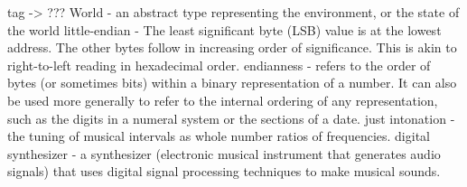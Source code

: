 tag -> ???
World - an abstract type representing the environment, or the state of the world
little-endian - The least significant byte (LSB) value is at the lowest address. The other bytes follow in increasing order of significance. This is akin to right-to-left reading in hexadecimal order.
endianness - refers to the order of bytes (or sometimes bits) within a binary representation of a number. It can also be used more generally to refer to the internal ordering of any representation, such as the digits in a numeral system or the sections of a date.
just intonation - the tuning of musical intervals as whole number ratios of frequencies. 
digital synthesizer - a synthesizer (electronic musical instrument that generates audio signals) that uses digital signal processing techniques to make musical sounds. 
